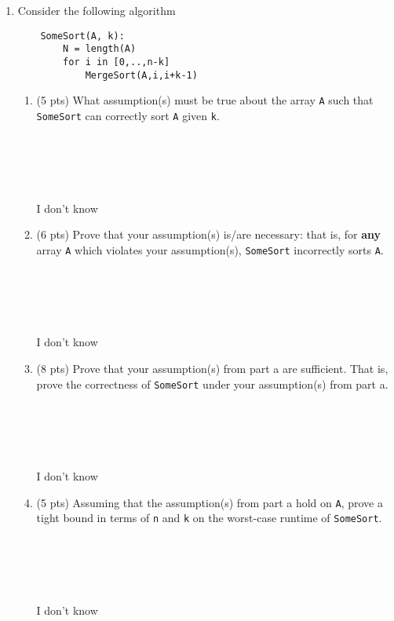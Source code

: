 \documentclass[12pt]{article}
\begin{document}
\begin{enumerate}
\item  Consider the following algorithm
\begin{small}
    \begin{verbatim}
    SomeSort(A, k):
        N = length(A)
        for i in [0,..,n-k]
            MergeSort(A,i,i+k-1)
    \end{verbatim}
\end{small}
\begin{enumerate}
    \item \label{3a} (5 pts) What assumption(s) must be true about the array {\tt A} such that 
        {\tt SomeSort} can correctly sort {\tt A} given {\tt k}. 
    \\ \\ \\ \\ \\ \\ I don't know
    \pagebreak	
    \item \label{3b} (6 pts) Prove that your assumption(s) is/are necessary: that is, for 
        {\bf any} array {\tt A} which violates your assumption(s), 
        {\tt SomeSort} incorrectly sorts {\tt A}.
    \\ \\ \\ \\ \\ \\ I don't know
    \pagebreak	
    \item \label{3c} (8 pts) Prove that your assumption(s) from part a are sufficient. That is,
        prove the correctness of {\tt SomeSort} under your assumption(s) from
        part a.
    \\ \\ \\ \\ \\ \\ I don't know
    \pagebreak	
    \item \label{3d} (5 pts) Assuming that the assumption(s) from part a hold on {\tt A}, prove a
        tight bound in terms of {\tt n} and {\tt k} on the worst-case runtime
        of {\tt SomeSort}.
    \\ \\ \\ \\ \\ \\ I don't know
    \pagebreak	
\end{enumerate}


\end{enumerate}
\end{document}

